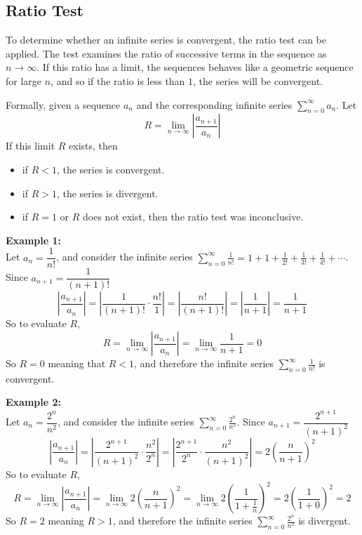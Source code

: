 \documentclass[11pt,a4paper,titlepage,oneside,openany]{article}
\begin{document}
\subsection*{Ratio Test}
To determine whether an infinite series is convergent, the ratio test can be applied. The test examines the ratio of successive terms in the sequence as $n \to \infty$. If this ratio has a limit, the sequences behaves like a geometric sequence for large $n$, and so if the ratio is less than $1$, the series will be convergent.

Formally, given a sequence $a_n$ and the corresponding infinite series $\displaystyle \sum_{n=0}^\infty a_n$. Let
\begin{equation*}
  R=\lim_{n \to \infty} \left|\frac{a_{n+1}}{a_n}\right|
\end{equation*}
If this limit $R$ exists, then
\begin{itemize}
\item if $R<1$, the series is convergent.
\item if $R>1$, the series is divergent.
\item if $R=1$ or $R$ does not exist, then the ratio test was inconclusive.
\end{itemize}
\noindent  \textbf{Example 1:}\\
Let $a_n=\dfrac{1}{n!}$, and consider the infinite series $\displaystyle \sum_{n=0}^{\infty} \frac{1}{n!} = 1+1+\frac{1}{2!}+\frac{1}{3!}+\frac{1}{4!}+\cdots$. Since $a_{n+1}=\dfrac{1}{(n+1)!}$
\begin{equation*}
  \left| \frac{a_{n+1}}{a_n}\right|=\left| \frac{1}{(n+1)!}\cdot \frac{n!}{1}\right|=\left| \frac{n!}{(n+1)!}\right|=\left| \frac{1}{n+1}\right|=\frac{1}{n+1}
\end{equation*}
So to evaluate $R$,
\begin{equation*}
  R=\lim_{n \to \infty} \left|\frac{a_{n+1}}{a_n}\right|=\lim_{n \to \infty} \frac{1}{n+1}=0
\end{equation*}
So $R=0$ meaning that $R<1$, and therefore the infinite series $ \sum_{n=0}^{\infty} \frac{1}{n!}$ is convergent.

\noindent  \textbf{Example 2:}\\
Let $a_n=\dfrac{2^n}{n^2}$, and consider the infinite series $\displaystyle \sum_{n=0}^{\infty} \frac{2^n}{n^2}$. Since $a_{n+1}=\dfrac{2^{n+1}}{(n+1)^2}$
\begin{equation*}
  \left| \frac{a_{n+1}}{a_n}\right|=\left| \frac{2^{n+1}}{(n+1)^2}\cdot \frac{n^2}{2^n}\right|=\left| \frac{2^{n+1}}{2^n}\cdot\frac{n^2}{(n+1)^2}\right|=2 \left(\frac{n}{n+1}\right)^2
\end{equation*}
So to evaluate $R$,
\begin{equation*}
  R=\lim_{n \to \infty} \left|\frac{a_{n+1}}{a_n}\right|=\lim_{n \to \infty} 2 \left(\frac{n}{n+1}\right)^2=\lim_{n \to \infty} 2 \left(\frac{1}{1+\frac{1}{n}}\right)^2=2\left(\frac{1}{1+0}\right)^2=2
\end{equation*}
So $R=2$ meaning $R>1$, and therefore the infinite series $\displaystyle \sum_{n=0}^{\infty} \frac{2^n}{n^2}$ is divergent.
\end{document}
